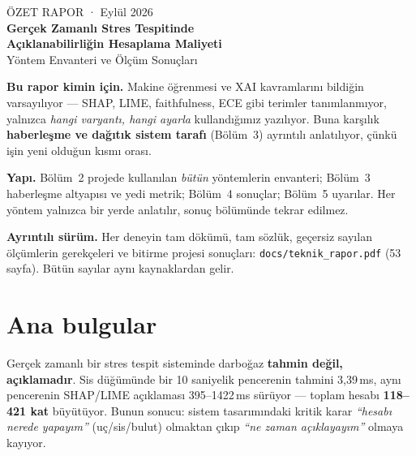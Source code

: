 \documentclass[11pt,a4paper]{article}
\newcommand{\ms}{\,ms}
\newcommand{\dosya}[1]{\texttt{\footnotesize #1}}
\begin{document}
\begin{center}
{\sffamily\small\color{anaRenk} ÖZET RAPOR \quad· Eylül 2026}\\[0.5em]
{\sffamily\LARGE\bfseries\color{anaRenk} Gerçek Zamanlı Stres Tespitinde\\[0.15em]
Açıklanabilirliğin Hesaplama Maliyeti}\\[0.45em]
{\sffamily\large Yöntem Envanteri ve Ölçüm Sonuçları}
\end{center}

\vspace{0.3em}
\begin{tcolorbox}[colback=acikMavi,colframe=anaRenk,boxrule=1pt,
  left=10pt,right=10pt,top=8pt,bottom=8pt]
\sffamily\small
\textbf{Bu rapor kimin için.} Makine öğrenmesi ve XAI kavramlarını bildiğin
varsayılıyor --- SHAP, LIME, faithfulness, ECE gibi terimler tanımlanmıyor,
yalnızca \emph{hangi varyantı, hangi ayarla} kullandığımız yazılıyor. Buna
karşılık \textbf{haberleşme ve dağıtık sistem tarafı} (Bölüm~3) ayrıntılı
anlatılıyor, çünkü işin yeni olduğun kısmı orası.

\vspace{0.25em}
\textbf{Yapı.} Bölüm~2 projede kullanılan \emph{bütün} yöntemlerin envanteri;
Bölüm~3 haberleşme altyapısı ve yedi metrik; Bölüm~4 sonuçlar; Bölüm~5
uyarılar. Her yöntem yalnızca bir yerde anlatılır, sonuç bölümünde tekrar
edilmez.

\vspace{0.25em}
\textbf{Ayrıntılı sürüm.} Her deneyin tam dökümü, tam sözlük, geçersiz sayılan
ölçümlerin gerekçeleri ve bitirme projesi sonuçları:
\dosya{docs/teknik\_rapor.pdf} (53 sayfa). Bütün sayılar aynı kaynaklardan
gelir.
\end{tcolorbox}

\section{Ana bulgular}

\begin{bulgu}
Gerçek zamanlı bir stres tespit sisteminde darboğaz \textbf{tahmin değil,
açıklamadır}. Sis düğümünde bir 10 saniyelik pencerenin tahmini 3{,}39\ms,
aynı pencerenin SHAP/LIME açıklaması 395--1422\ms{} sürüyor --- toplam hesabı
\textbf{118--421 kat} büyütüyor. Bunun sonucu: sistem tasarımındaki kritik
karar \emph{``hesabı nerede yapayım''} (uç/sis/bulut) olmaktan çıkıp
\emph{``ne zaman açıklayayım''} olmaya kayıyor.
\end{bulgu}
\end{document}
